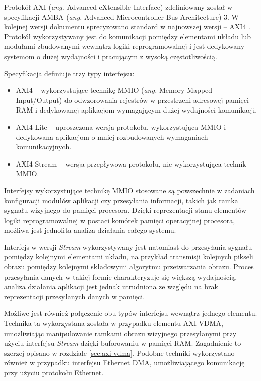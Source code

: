 Protokół AXI (\emph{ang.} Advanced eXtensible Interface) zdefiniowany został w specyfikacji AMBA (\emph{ang.} Advanced Microcontroller Bus Architecture) 3. 
W kolejnej wersji dokumentu sprecyzowano standard w najnowszej wersji -- AXI4 \cite{axi-spec}. 
Protokół wykorzystywany jest do komunikacji pomiędzy elementami układu lub modułami zbudowanymi wewnątrz logiki reprogramowalnej i jest dedykowany systemom o dużej wydajności i pracującym z wysoką częstotliwością.

Specyfikacja definiuje trzy typy interfejsu:
\begin{itemize}
	\item AXI4 -- wykorzystujące technikę MMIO (\emph{ang.} Memory-Mapped Input/Output) do odwzorowania rejestrów w przestrzeni adresowej pamięci RAM i dedykowanej aplikacjom wymagającym dużej wydajności komunikacji.
	\item AXI4-Lite -- uproszczona wersja protokołu, wykorzystująca MMIO i dedykowana aplikacjom o mniej rozbudowanych wymaganiach komunikacyjnych.
	\item AXI4-Stream -- wersja przepływowa protokołu, nie wykorzystująca technik MMIO.
\end{itemize}

Interfejsy wykorzystujące technikę MMIO stosowane są powszechnie w zadaniach konfiguracji modułów aplikacji czy przesyłania informacji, takich jak ramka sygnału wizyjnego do pamięci procesora. 
Dzięki reprezentacji stanu elementów logiki reprogramowalnej w postaci komórek pamięci operacyjnej procesora, możliwa jest jednolita analiza działania całego systemu. 

Interfejs w wersji \emph{Stream} wykorzystywany jest natomiast do przesyłania sygnału pomiędzy kolejnymi elementami układu, na przykład transmisji kolejnych pikseli obrazu pomiędzy kolejnymi składowymi algorytmu przetwarzania obrazu. 
Proces przesyłania danych w takiej formie charakteryzuje się większą wydajnością, analiza działania aplikacji jest jednak utrudniona ze względu na brak reprezentacji przesyłanych danych w pamięci.

Możliwe jest również połączenie obu typów interfejsu wewnątrz jednego elementu. 
Technika ta wykorzystana została w przypadku elementu AXI VDMA, umożliwiając manipulowanie ramkami obrazu wizyjnego przesyłanymi przy użyciu interfejsu \emph{Stream} dzięki buforowaniu w pamięci RAM. 
Zagadnienie to szerzej opisano w rozdziale \ref{sec:axi-vdma}. 
Podobne techniki wykorzystano również w przypadku interfejsu Ethernet DMA, umożliwiającego komunikację przy użyciu protokołu Ethernet.

